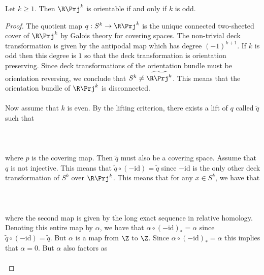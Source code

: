 \documentclass[a4paper]{article}
\begin{document}
\begin{prp}{}{} Let $k\geq 1$. Then $\R\Prj^k$ is orientable if and only if $k$ is odd. \tcbline
\begin{proof}
The quotient map $q:S^k\to\R\Prj^k$ is the unique connected two-sheeted cover of $\R\Prj^k$ by Galois theory for covering spaces. The non-trivial deck transformation is given by the antipodal map which has degree $(-1)^{k+1}$. If $k$ is odd then this degree is $1$ so that the deck transformation is orientation preserving. Since deck transformations of the orientation bundle must be orientation reversing, we conclude that $S^k\neq\widetilde{\R\Prj^k}$. This means that the orientation bundle of $\R\Prj^k$ is disconnected. \\~\\

Now assume that $k$ is even. By the lifting criterion, there exists a lift of $q$ called $\widetilde{q}$ such that \\~\\
\\~\\
where $p$ is the covering map. Then $\widetilde{q}$ must also be a covering space. Assume that $q$ is not injective. This means that $\widetilde{q}\circ(-\text{id})=\widetilde{q}$ since $-\text{id}$ is the only other deck transformation of $S^k$ over $\R\Prj^k$. This means that for any $x\in S^k$, we have that \\~\\
\\~\\
where the second map is given by the long exact sequence in relative homology. Denoting this entire map by $\alpha$, we have that $\alpha\circ(-\text{id})_\ast=\alpha$ since $\widetilde{q}\circ(-\text{id})=\widetilde{q}$. But $\alpha$ is a map from $\Z$ to $\Z$. Since $\alpha\circ(-\text{id})_\ast=\alpha$ this implies that $\alpha=0$. But $\alpha$ also factors as \\~\\

\end{proof}
\end{prp}
\end{document}
